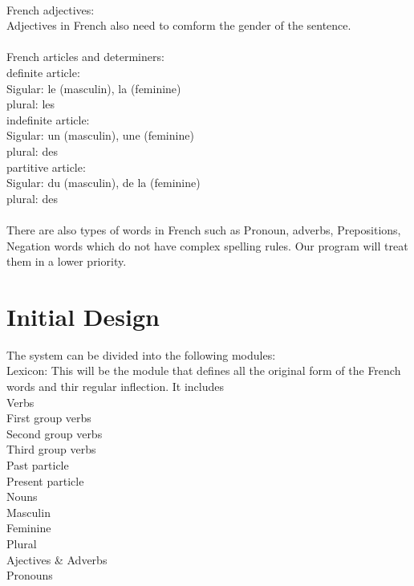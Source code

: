 \documentclass[11pt,letterpaper]{article}
\begin{document}
\\
French adjectives:\\
Adjectives in French also need to comform the gender of the sentence.\\
\\
French articles and determiners:\\
\indent definite article:\\
\indent\indent Sigular: le (masculin), la (feminine)\\
\indent\indent plural: les\\
\indent indefinite article:\\
\indent\indent Sigular: un (masculin), une (feminine)\\
\indent\indent plural: des\\
\indent partitive article:\\
\indent\indent Sigular: du (masculin), de la (feminine)\\
\indent\indent plural: des\\
\\
There are also types of words in French such as Pronoun, adverbs, Prepositions, Negation words which do not have complex spelling rules. Our program will treat them in a lower priority.

\section{Initial Design}
The system can be divided into the following modules:\\
\indent Lexicon: This will be the module that defines all the original form of the French words and thir regular inflection. It includes\\
\indent\indent Verbs\\
\indent\indent\indent First group verbs\\
\indent\indent\indent Second group verbs\\
\indent\indent\indent Third group verbs\\
\indent\indent\indent Past particle\\
\indent\indent\indent Present particle\\
\indent\indent Nouns\\
\indent\indent\indent Masculin\\
\indent\indent\indent Feminine\\
\indent\indent\indent Plural\\
\indent\indent Ajectives \& Adverbs\\
\indent\indent Pronouns\\
\end{document}
